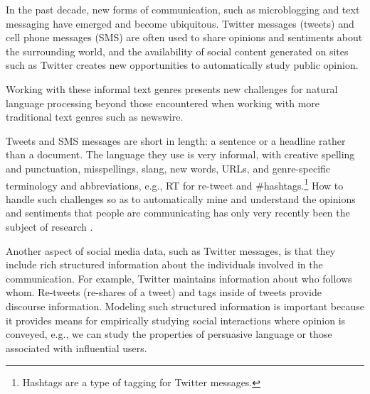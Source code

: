 
In the past decade, new forms of communication, such as microblogging and text messaging have emerged and become ubiquitous.  Twitter messages (tweets) and cell phone messages (SMS) are often used to share opinions and sentiments about the surrounding world, and the availability of social content generated on sites such as Twitter creates new opportunities to automatically study public opinion.

Working with these informal text genres presents new challenges for natural language processing
beyond those encountered when working with more traditional text genres such as newswire.

Tweets and SMS messages are short in length: a sentence or a headline rather than a document.  The language they use is very informal, with creative spelling and punctuation, misspellings, slang, new words, URLs, and genre-specific terminology and abbreviations, e.g., RT for re-tweet and \#hashtags.\footnote{Hashtags are a type of tagging for Twitter messages.}  How to handle such challenges so as to automatically mine and understand the opinions and sentiments that people are communicating has only very recently been the subject of research \cite{Jansen09,Barbosa10,Bifet11,Davidov10,oconnor10,Pak10,Tumasjan10,Kouloumpis11}.


Another aspect of social media data, such as Twitter messages, is that they include rich structured information about the individuals involved in the communication. For example, Twitter maintains information about who follows whom. Re-tweets (re-shares of a tweet) and tags inside of tweets provide discourse information. Modeling such structured information is important because it provides means for empirically studying social interactions where opinion is conveyed, e.g., we can study the properties of persuasive language or those associated with influential users.

